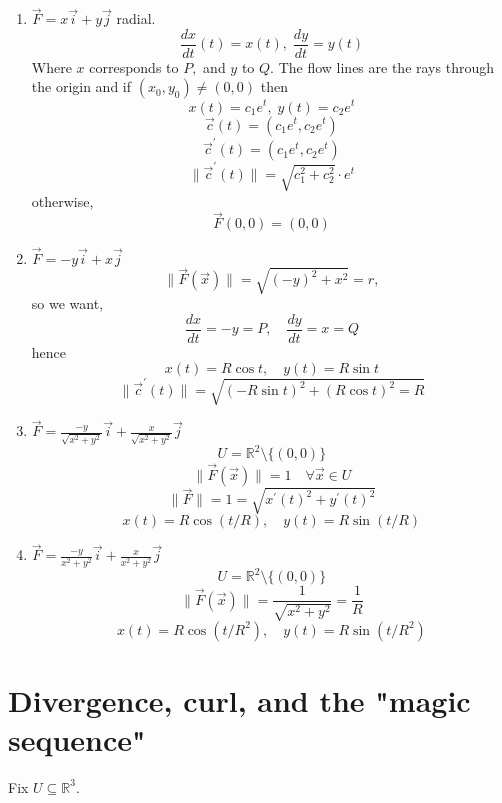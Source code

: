 \documentclass[12pt]{book}
\theoremstyle{definition}
\theoremstyle{remark}
\begin{document}
\begin{example} $  $
  \begin{enumerate}
    \item $\vec{{F}} = x \vec{{i }} + y \vec{{j}}  $ radial. 
    $$\frac{d {x}}{d {t}} {(t)} = x(t), \; \frac{d {y}}{d {t}} ={y(t)} $$
   Where $x$ corresponds to $P,$ and $y$ to $Q.$ The flow lines are the rays through the origin and if $(x_0, y_0 ) \neq (0,0)$ then 
    $$x(t) = c_1 e^t, \; y(t) = c_2 e^t $$
    $$\vec{{c}} {(t)} = (c_1 e^t , c_2 e^t) $$
$$\vec{{c}}^\prime {(t)} = (c_1 e^t , c_2 e^t) $$
    $$\| \vec{{c}}^\prime (t)\| = \sqrt{c_1^2 + c_2^2 } \cdot e^t $$
    otherwise, 
    $$\vec{{F}} {(0,0)} = (0,0) $$
    \item $\vec{{F}} = -y \vec{{i}} + x \vec{{j}}$
    $$\| \vec{{F}} (\vec{{x}})\| = \sqrt{ (-y)^2 + x^2} = r, $$
    so we want,
    $$\frac{d {x}}{d {t}} = -y = P,\quad \frac{d {y}}{d {t}} = x= Q $$
    hence 
    $$x(t) = R\cos t,\quad y(t) = R \sin t $$
    $$\|\vec{{c}}^\prime (t)\|= \sqrt{ (- R \sin t)^2 + (R \cos t)^2 = R} $$
    \item $\vec{{F}} = \frac{-y}{\sqrt{x^2 + y^2}} \vec{{i}} + \frac{x}{\sqrt{x^2 + y^2}} \vec{{j}}   $
    $$U = \mathbb{R}^2\setminus \{(0,0)\} $$
    $$\|\vec{F} (\vec{{x}}) \| = 1 \quad \forall \vec{{x}} \in U  $$
    $$\| \vec{{F}} \| = 1 = \sqrt{x^\prime (t)^2 + y^ \prime (t)^2} $$
    $$x(t) = R \cos (t/R) , \quad y(t) = R \sin (t/R) $$
    \item $\vec{{F}} = \frac{-y}{{x^2 + y^2}} \vec{{i}} + \frac{x}{{x^2 + y^2}} \vec{{j}} $
    $$U = \mathbb{R}^2\setminus \{(0,0)\} $$
    $$\| \vec{{F}} (\vec{{x}} )\| = \frac{1}{\sqrt{x^2 +y^2}} = \frac{1}{R}   $$
    $$x(t) = R \cos (t/R^2), \quad y(t) = R \sin (t/R^2) $$
  \end{enumerate}
  
\end{example}  
  \section{Divergence, curl, and the "magic sequence"}
  Fix $U \subseteq \mathbb{R}^3$. 
\end{document}
